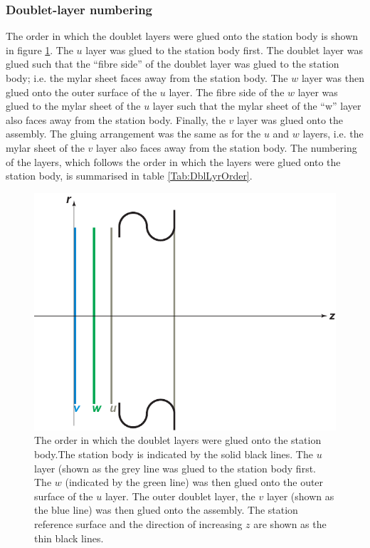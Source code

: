 \subsubsection{Doublet-layer numbering}
\label{SubSubSect:DblNmbrng}

The order in which the doublet layers were glued onto the station body is shown in figure \ref{Fig:DblLyrOrder}. The $u$ layer was glued to the station body first. The doublet layer was glued such that the ``fibre side'' of the doublet layer was glued to the station body; i.e. the mylar sheet faces away from the station body. The $w$ layer was then glued onto the outer surface of the $u$ layer. The fibre side of the $w$ layer was glued to the mylar sheet of the $u$ layer such that the mylar sheet of the ``w'' layer also faces away from the station body. Finally, the $v$ layer was glued onto the assembly. The gluing arrangement was the same as for the $u$ and $w$ layers, i.e. the mylar sheet of the $v$ layer also faces away from the station body. The numbering of the layers, which follows the order in which the layers were glued onto the station body, is summarised in table \ref{Tab:DblLyrOrder}.

\begin{figure}
  \begin{center}
    \includegraphics[width=0.65\linewidth]{detectors/tracker/02-Definitions/Figures/doublet-layer-order.pdf}
  \end{center}
  \caption{ The order in which the doublet layers were glued onto the station body.The station body is indicated by the solid black lines. The $u$ layer (shown as the grey line was glued to the station body first. The $w$ (indicated by the green line) was then glued onto the outer surface of the $u$ layer.  The outer doublet layer, the $v$ layer (shown as the blue line) was then glued onto the assembly. The station reference surface and the direction of increasing $z$  are shown as the thin black lines.}
  \label{Fig:DblLyrOrder}
\end{figure}

